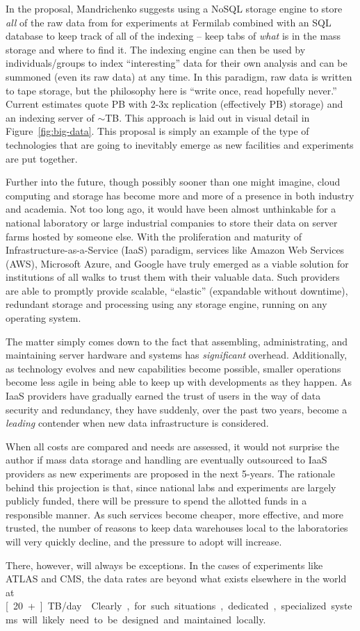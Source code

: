 In the proposal, Mandrichenko suggests using a NoSQL storage engine to store \emph{all} of the raw data from for experiments at Fermilab combined with an SQL database to keep track of all of the indexing -- keep tabs of \emph{what} is in the mass storage and where to find it. The indexing engine can then be used by individuals/groups to index ``interesting'' data for their own analysis and can be summoned (even its raw data) at any time. In this paradigm, raw data is written to tape storage, but the philosophy here is ``write once, read hopefully never.'' Current estimates quote \unit[5]{PB} with 2-3x replication (effectively \unit[2]{PB}) storage) and an indexing server of $\sim$\unit[100]{TB}. This approach is laid out in visual detail in Figure~\ref{fig:big-data}. This proposal is simply an example of the type of technologies that are going to inevitably emerge as new facilities and experiments are put together.

Further into the future, though possibly sooner than one might imagine, cloud computing and storage has become more and more of a presence in both industry and academia. Not too long ago, it would have been almost unthinkable for a national laboratory or large industrial companies to store their data on server farms hosted by someone else. With the proliferation and maturity of Infrastructure-as-a-Service (IaaS) paradigm, services like Amazon Web Services (AWS), Microsoft Azure, and Google have truly emerged as a viable solution for institutions of all walks to trust them with their valuable data. Such providers are able to promptly provide scalable, ``elastic'' (expandable without downtime), redundant storage and processing using any storage engine, running on any operating system.

The matter simply comes down to the fact that assembling, administrating, and maintaining server hardware and systems has \emph{significant} overhead. Additionally, as technology evolves and new capabilities become possible, smaller operations become less agile in being able to keep up with developments as they happen. As IaaS providers have gradually earned the trust of users in the way of data security and redundancy, they have suddenly, over the past two years, become a \emph{leading} contender when new data infrastructure is considered.

When all costs are compared and needs are assessed, it would not surprise the author if mass data storage and handling are eventually outsourced to IaaS providers as new experiments are proposed in the next 5-\unit[10]{years}. The rationale behind this projection is that, since national labs and experiments are largely publicly funded, there will be pressure to spend the allotted funds in a responsible manner. As such services become cheaper, more effective, and more trusted, the number of reasons to keep data warehouses local to the laboratories will very quickly decline, and the pressure to adopt will increase.

There, however, will always be exceptions. In the cases of experiments like ATLAS and CMS, the data rates are beyond what exists elsewhere in the world at \unit[20+]{TB/day}~\cite{Andre:2015jty}. Clearly, for such situations, dedicated, specialized systems will likely need to be designed and maintained locally.

